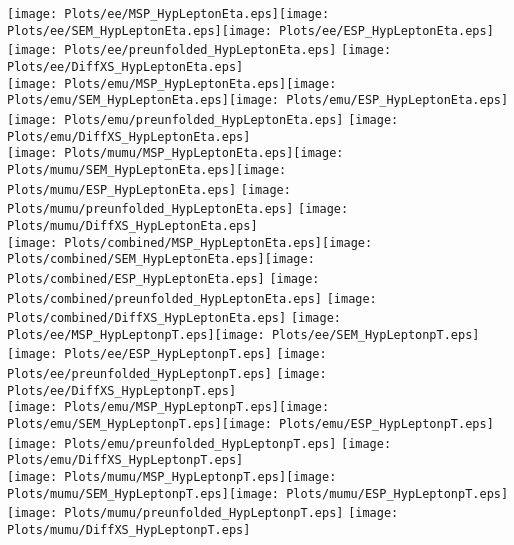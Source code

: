 \documentclass[a4paper,10pt,landscape,pagesize]{scrartcl}
\begin{document}
\centering
\texttt{[image: Plots/ee/MSP\_HypLeptonEta.eps]}\texttt{[image: Plots/ee/SEM\_HypLeptonEta.eps]}\texttt{[image: Plots/ee/ESP\_HypLeptonEta.eps]} \texttt{[image: Plots/ee/preunfolded\_HypLeptonEta.eps]} \texttt{[image: Plots/ee/DiffXS\_HypLeptonEta.eps]}\\
\texttt{[image: Plots/emu/MSP\_HypLeptonEta.eps]}\texttt{[image: Plots/emu/SEM\_HypLeptonEta.eps]}\texttt{[image: Plots/emu/ESP\_HypLeptonEta.eps]} \texttt{[image: Plots/emu/preunfolded\_HypLeptonEta.eps]} \texttt{[image: Plots/emu/DiffXS\_HypLeptonEta.eps]}\\
\texttt{[image: Plots/mumu/MSP\_HypLeptonEta.eps]}\texttt{[image: Plots/mumu/SEM\_HypLeptonEta.eps]}\texttt{[image: Plots/mumu/ESP\_HypLeptonEta.eps]} \texttt{[image: Plots/mumu/preunfolded\_HypLeptonEta.eps]} \texttt{[image: Plots/mumu/DiffXS\_HypLeptonEta.eps]}\\
\texttt{[image: Plots/combined/MSP\_HypLeptonEta.eps]}\texttt{[image: Plots/combined/SEM\_HypLeptonEta.eps]}\texttt{[image: Plots/combined/ESP\_HypLeptonEta.eps]} \texttt{[image: Plots/combined/preunfolded\_HypLeptonEta.eps]} \texttt{[image: Plots/combined/DiffXS\_HypLeptonEta.eps]}
\newpage
\texttt{[image: Plots/ee/MSP\_HypLeptonpT.eps]}\texttt{[image: Plots/ee/SEM\_HypLeptonpT.eps]}\texttt{[image: Plots/ee/ESP\_HypLeptonpT.eps]} \texttt{[image: Plots/ee/preunfolded\_HypLeptonpT.eps]} \texttt{[image: Plots/ee/DiffXS\_HypLeptonpT.eps]}\\
\texttt{[image: Plots/emu/MSP\_HypLeptonpT.eps]}\texttt{[image: Plots/emu/SEM\_HypLeptonpT.eps]}\texttt{[image: Plots/emu/ESP\_HypLeptonpT.eps]} \texttt{[image: Plots/emu/preunfolded\_HypLeptonpT.eps]} \texttt{[image: Plots/emu/DiffXS\_HypLeptonpT.eps]}\\
\texttt{[image: Plots/mumu/MSP\_HypLeptonpT.eps]}\texttt{[image: Plots/mumu/SEM\_HypLeptonpT.eps]}\texttt{[image: Plots/mumu/ESP\_HypLeptonpT.eps]} \texttt{[image: Plots/mumu/preunfolded\_HypLeptonpT.eps]} \texttt{[image: Plots/mumu/DiffXS\_HypLeptonpT.eps]}\\
\end{document}
